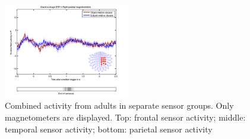 \begin{figure}[h]
\begin{center}
\includegraphics[width=0.49\textwidth]{pics/adults_Right-parietal-magnetometers.png}
\caption{\label{4.2.activity.adults} Combined activity from adults in separate sensor groups. Only magnetometers are displayed. Top: frontal sensor activity; middle: temporal sensor activity; bottom: parietal sensor activity}
\end{center}
\end{figure}